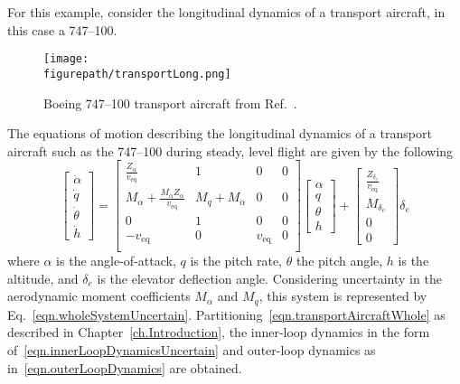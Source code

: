 For this example, consider the longitudinal dynamics of a transport aircraft, in this case a 747--100.
\begin{figure}[H]
  \begin{center}
    \texttt{[image: \\figurepath/transportLong.png]}
    \vspace{-0.1in}
    \caption{Boeing 747--100 transport aircraft from Ref.\ \cite{nelson.flightcontrol.1998}.\label{fig.transportLong}}
  \end{center}
\end{figure}
The equations of motion describing the longitudinal dynamics of a transport aircraft such as the 747--100 during steady, level flight are given by the following
\begin{equation}
  \label{eqn.transportAircraftWhole}
  \begin{bmatrix}
    \dot{\alpha} \\
    \dot{q} \\
    \dot{\theta} \\
    \dot{h}
  \end{bmatrix}=
  \begin{bmatrix}
    \frac{Z_{\alpha}}{v_{\text{eq}}} & 1 & 0 & 0 \\
    M_{\alpha}+\frac{M_{\dot{\alpha}}Z_{\alpha}}{v_{\text{eq}}} & M_{q}+M_{\dot{\alpha}} & 0 & 0 \\
    0 & 1 & 0 & 0 \\
    -v_{\text{eq}} & 0 & v_{\text{eq}} & 0 \\
  \end{bmatrix}
  \begin{bmatrix}
    \alpha \\
    q \\
    \theta \\
    h
  \end{bmatrix}+
  \begin{bmatrix}
    \frac{Z_{\delta_{e}}}{v_{\text{eq}}} \\
    M_{\delta_{e}} \\
    0 \\
    0
  \end{bmatrix}
  \delta_{e}
\end{equation}
where $\alpha$ is the angle-of-attack, $q$ is the pitch rate, $\theta$ the pitch angle, $h$ is the altitude, and $\delta_{e}$ is the elevator deflection angle.
Considering uncertainty in the aerodynamic moment coefficients $M_{\alpha}$ and $M_{q}$, this system is represented by Eq.\ \eqref{eqn.wholeSystemUncertain}.
Partitioning\ \eqref{eqn.transportAircraftWhole} as described in Chapter~\ref{ch.Introduction}, the inner-loop dynamics in the form of\ \eqref{eqn.innerLoopDynamicsUncertain} and outer-loop dynamics as in\ \eqref{eqn.outerLoopDynamics} are obtained.
